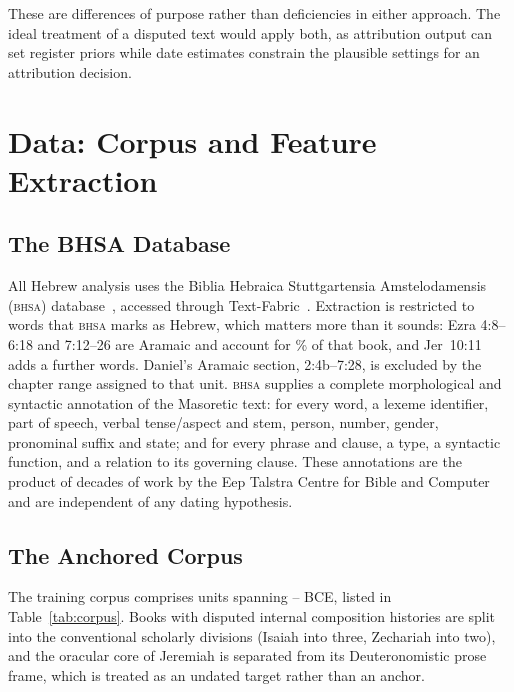 \documentclass[10pt,letterpaper]{article}
\newcommand{\bhsa}{\textsc{bhsa}}
\begin{document}
These are differences of purpose rather than deficiencies in either approach.
The ideal treatment of a disputed text would apply both, as attribution output
can set register priors while date estimates constrain the plausible settings
for an attribution decision.

\section*{Data: Corpus and Feature Extraction}

\subsection*{The BHSA Database}

All Hebrew analysis uses the Biblia Hebraica Stuttgartensia Amstelodamensis
(\bhsa{}) database~\cite{BHSA2021}, accessed through
Text-Fabric~\cite{Roorda2018}.  Extraction is restricted to words that \bhsa{}
marks as Hebrew, which matters more than it sounds: Ezra 4:8--6:18 and 7:12--26
are Aramaic and account for \arwEzra\% of that book, and Jer~10:11 adds a
further \arwJer{} words.  Daniel's Aramaic section, 2:4b--7:28, is excluded by
the chapter range assigned to that unit.  \bhsa{} supplies a complete morphological and
syntactic annotation of the Masoretic text: for every word, a lexeme
identifier, part of speech, verbal tense/aspect and stem, person, number,
gender, pronominal suffix and state; and for every phrase and clause, a type,
a syntactic function, and a relation to its governing clause.  These
annotations are the product of decades of work by the Eep Talstra Centre for
Bible and Computer and are independent of any dating hypothesis.

\subsection*{The Anchored Corpus}

The training corpus comprises \HBbooks{} units spanning \HBoldest--\HBlatest{}
BCE, listed in Table~\ref{tab:corpus}.  Books with disputed internal composition
histories are split into the conventional scholarly divisions (Isaiah into
three, Zechariah into two), and the oracular core of Jeremiah is separated from
its Deuteronomistic prose frame, which is treated as an undated target rather
than an anchor.
\end{document}
